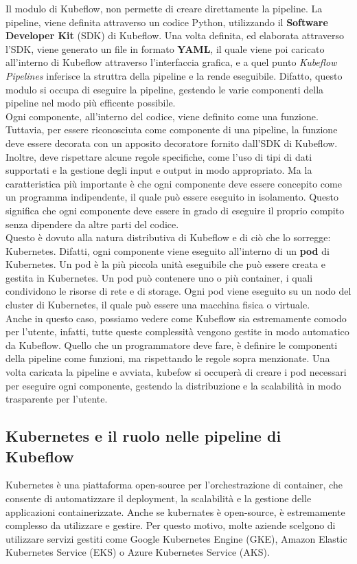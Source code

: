 Il modulo di Kubeflow, non permette di creare direttamente la pipeline. La pipeline,
viene definita attraverso un codice Python, utilizzando
il \textbf{Software Developer Kit} (SDK) di Kubeflow. Una volta definita, ed elaborata attraverso l'SDK, viene generato
un file in formato \textbf{YAML}, il quale viene poi caricato all'interno di Kubeflow
attraverso l'interfaccia grafica, e a quel punto \textit{Kubeflow Pipelines} inferisce
la struttra della pipeline e la rende eseguibile. Difatto, questo modulo
si occupa di  eseguire la pipeline, gestendo le varie componenti della pipeline 
nel modo più efficente possibile.\\

Ogni componente, all'interno del codice, viene definito come una funzione. Tuttavia,
per essere riconosciuta come componente di una pipeline, la funzione deve essere
decorata con un apposito decoratore fornito dall'SDK di Kubeflow.
Inoltre, deve rispettare alcune regole specifiche, come l'uso di tipi di dati supportati
e la gestione degli input e output in modo appropriato. Ma la caratteristica più importante
è che ogni componente deve essere concepito come un programma indipendente, il quale
può essere eseguito in isolamento. Questo significa che ogni componente deve essere in grado
di eseguire il proprio compito senza dipendere da altre parti del codice.\\

Questo è dovuto alla natura distributiva di Kubeflow e di ciò che lo sorregge: Kubernetes.
Difatti, ogni componente viene eseguito all'interno di un \textbf{pod} di Kubernetes.
Un pod è la più piccola unità eseguibile che può essere creata e gestita in Kubernetes.
Un pod può contenere uno o più container, i quali condividono le risorse di rete e di storage.
Ogni pod viene eseguito su un nodo del cluster di Kubernetes, il quale può essere una macchina fisica
o virtuale.\\

Anche in questo caso, possiamo vedere come Kubeflow sia estremamente comodo per l'utente,
infatti, tutte queste complessità vengono gestite in modo automatico da Kubeflow. Quello che 
un programmatore deve fare, è definire le componenti della pipeline come funzioni, ma rispettando
le regole sopra menzionate. Una volta caricata la pipeline e avviata, kubefow si occuperà
di creare i pod necessari per eseguire ogni componente, gestendo la distribuzione e la scalabilità
in modo trasparente per l'utente.


\subsection{Kubernetes e il ruolo nelle pipeline di Kubeflow}
Kubernetes è una piattaforma open-source per l'orchestrazione di container, che consente
di automatizzare il deployment, la scalabilità e la gestione delle applicazioni containerizzate.
Anche se kubernates è open-source, è estremamente complesso da utilizzare e gestire.
Per questo motivo, molte aziende scelgono di utilizzare servizi gestiti come Google Kubernetes Engine (GKE),
Amazon Elastic Kubernetes Service (EKS) o Azure Kubernetes Service (AKS).\\


